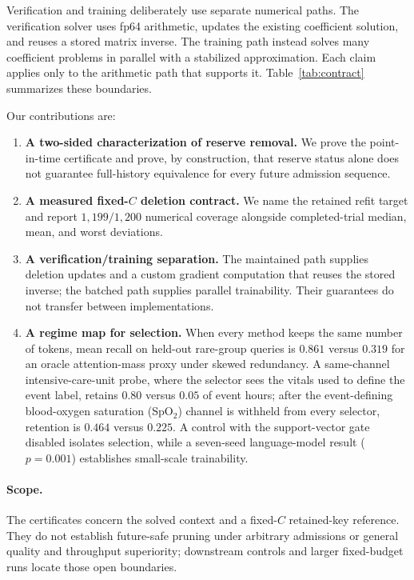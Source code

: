 Verification and training deliberately use separate numerical paths. The
verification solver uses fp64 arithmetic, updates the existing coefficient
solution, and reuses a stored matrix inverse. The
training path instead solves many coefficient problems in parallel with a
stabilized approximation. Each claim applies only to the arithmetic path that
supports it. Table~\ref{tab:contract} summarizes these boundaries.

Our contributions are:

\begin{enumerate}
\item \textbf{A two-sided characterization of reserve removal.} We prove the
point-in-time certificate and prove, by construction, that reserve status alone
does not guarantee full-history equivalence for every future admission
sequence.
\item \textbf{A measured fixed-\(C\) deletion contract.} We name the retained
refit target and report \(1{,}199/1{,}200\) numerical coverage alongside
completed-trial median, mean, and worst deviations.
\item \textbf{A verification/training separation.} The maintained path supplies
deletion updates and a custom gradient computation that reuses the stored
inverse; the batched path supplies parallel trainability. Their guarantees do
not transfer between implementations.
\item \textbf{A regime map for selection.} When every method keeps the same
number of tokens, mean recall on held-out rare-group queries is \(0.861\)
versus \(0.319\) for an oracle attention-mass proxy under skewed redundancy.
A same-channel intensive-care-unit probe, where the selector sees the vitals
used to define the event label, retains \(0.80\) versus \(0.05\) of event hours;
after the event-defining blood-oxygen saturation (SpO\(_2\)) channel is withheld
from every selector, retention is \(0.464\) versus \(0.225\). A control with the
support-vector gate disabled isolates selection, while a seven-seed
language-model result (\(p=0.001\)) establishes small-scale trainability.
\end{enumerate}

\paragraph{Scope.}
The certificates concern the solved context and a fixed-\(C\) retained-key
reference. They do not establish future-safe pruning under arbitrary
admissions or general quality and throughput superiority; downstream controls
and larger fixed-budget runs locate those open boundaries.

